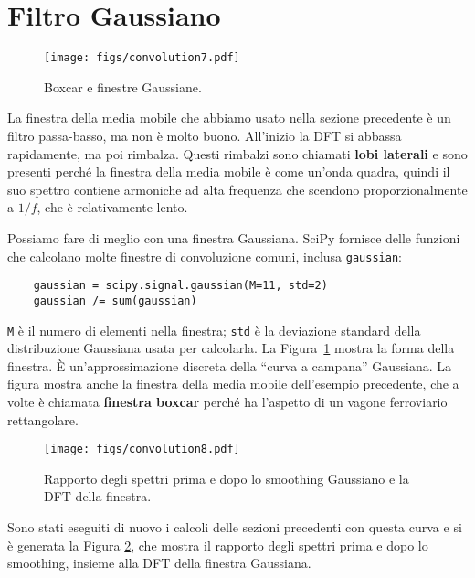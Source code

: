 \documentclass[12pt,a4paper]{book}
\begin{document}
\section{Filtro Gaussiano} 

\begin{figure} 

\centerline{\texttt{[image: figs/convolution7.pdf]}} \caption{Boxcar e finestre Gaussiane.} \label{fig.convolution7} \end{figure} 

La finestra della media mobile che abbiamo usato nella sezione precedente è un filtro passa-basso, ma non è molto buono. All'inizio la DFT si abbassa rapidamente, ma poi rimbalza. Questi rimbalzi sono chiamati {\bf lobi laterali} e sono presenti perché la finestra della media mobile è come un'onda quadra, quindi il suo spettro contiene armoniche ad alta frequenza che scendono proporzionalmente a $1/f$, che è relativamente lento.

Possiamo fare di meglio con una finestra Gaussiana. SciPy fornisce delle funzioni che calcolano molte finestre di convoluzione comuni, inclusa {\tt gaussian}:

\begin{verbatim} 
    gaussian = scipy.signal.gaussian(M=11, std=2)
    gaussian /= sum(gaussian)
 \end{verbatim} 

{\tt M} è il numero di elementi nella finestra; {\tt std} è la deviazione standard della distribuzione Gaussiana usata per calcolarla. La Figura~\ref{fig.convolution7} mostra la forma della finestra. È un'approssimazione discreta della ``curva a campana'' Gaussiana. La figura mostra anche la finestra della media mobile dell'esempio precedente, che a volte è chiamata {\bf finestra boxcar} perché ha l'aspetto di un vagone ferroviario rettangolare.

\begin{figure} 

\centerline{\texttt{[image: figs/convolution8.pdf]}} \caption{Rapporto degli spettri prima e dopo lo smoothing Gaussiano e la DFT della finestra.} \label{fig.convolution8} \end{figure} 

Sono stati eseguiti di nuovo i calcoli delle sezioni precedenti con questa curva e si è generata la Figura \ref{fig.convolution8}, che mostra il rapporto degli spettri prima e dopo lo smoothing, insieme alla DFT della finestra Gaussiana.
\end{document}

